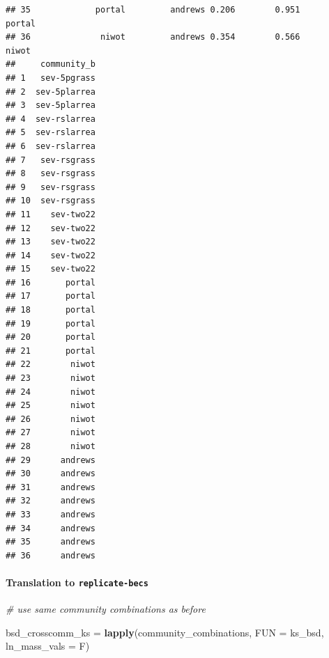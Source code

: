 \documentclass[]{article}
\newenvironment{Shaded}{\begin{snugshade}}{\end{snugshade}}
\newcommand{\KeywordTok}[1]{\textcolor[rgb]{0.13,0.29,0.53}{\textbf{#1}}}
\newcommand{\DataTypeTok}[1]{\textcolor[rgb]{0.13,0.29,0.53}{#1}}
\newcommand{\StringTok}[1]{\textcolor[rgb]{0.31,0.60,0.02}{#1}}
\newcommand{\CommentTok}[1]{\textcolor[rgb]{0.56,0.35,0.01}{\textit{#1}}}
\newcommand{\NormalTok}[1]{#1}
\let\oldparagraph\paragraph
\renewcommand{\paragraph}[1]{\oldparagraph{#1}\mbox{}}
\begin{document}
\begin{verbatim}
## 35             portal         andrews 0.206        0.951       portal
## 36              niwot         andrews 0.354        0.566        niwot
##     community_b
## 1   sev-5pgrass
## 2  sev-5plarrea
## 3  sev-5plarrea
## 4  sev-rslarrea
## 5  sev-rslarrea
## 6  sev-rslarrea
## 7   sev-rsgrass
## 8   sev-rsgrass
## 9   sev-rsgrass
## 10  sev-rsgrass
## 11    sev-two22
## 12    sev-two22
## 13    sev-two22
## 14    sev-two22
## 15    sev-two22
## 16       portal
## 17       portal
## 18       portal
## 19       portal
## 20       portal
## 21       portal
## 22        niwot
## 23        niwot
## 24        niwot
## 25        niwot
## 26        niwot
## 27        niwot
## 28        niwot
## 29      andrews
## 30      andrews
## 31      andrews
## 32      andrews
## 33      andrews
## 34      andrews
## 35      andrews
## 36      andrews
\end{verbatim}

\paragraph{\texorpdfstring{Translation to
\texttt{replicate-becs}}{Translation to replicate-becs}}\label{translation-to-replicate-becs-7}

\begin{Shaded}
\begin{Highlighting}[]
\CommentTok{# use same community combinations as before}

\NormalTok{bsd_crosscomm_ks =}\StringTok{ }\KeywordTok{lapply}\NormalTok{(community_combinations, }\DataTypeTok{FUN =}\NormalTok{ ks_bsd, }
                          \DataTypeTok{ln_mass_vals =}\NormalTok{ F)}
\end{Highlighting}
\end{Shaded}
\end{document}
